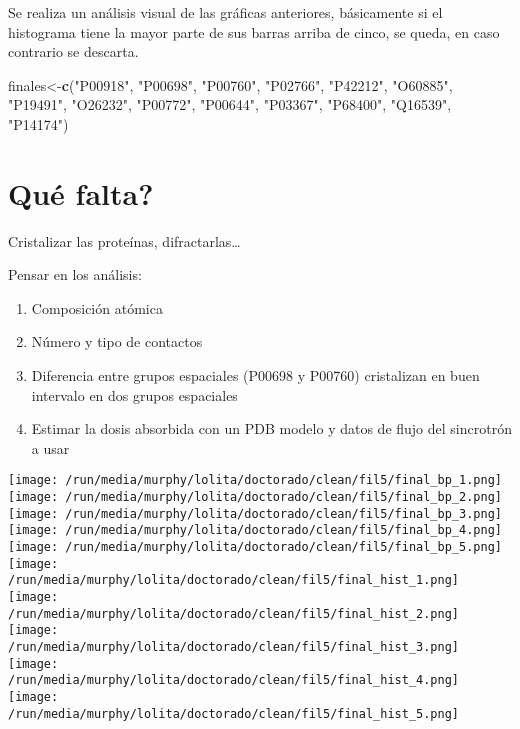\documentclass[
]{book}
\newenvironment{Shaded}{\begin{snugshade}}{\end{snugshade}}
\newcommand{\KeywordTok}[1]{\textcolor[rgb]{0.13,0.29,0.53}{\textbf{#1}}}
\newcommand{\NormalTok}[1]{#1}
\newcommand{\StringTok}[1]{\textcolor[rgb]{0.31,0.60,0.02}{#1}}
\providecommand{\tightlist}{%
  \setlength{\itemsep}{0pt}\setlength{\parskip}{0pt}}
\begin{document}
Se realiza un análisis visual de las gráficas anteriores, básicamente si el histograma tiene la mayor parte de sus barras arriba de cinco, se queda, en caso contrario se descarta.

\begin{Shaded}
\begin{Highlighting}[]
\NormalTok{finales\textless{}{-}}\KeywordTok{c}\NormalTok{(}\StringTok{"P00918"}\NormalTok{, }\StringTok{"P00698"}\NormalTok{, }\StringTok{"P00760"}\NormalTok{, }\StringTok{"P02766"}\NormalTok{, }\StringTok{"P42212"}\NormalTok{, }\StringTok{"O60885"}\NormalTok{, }\StringTok{"P19491"}\NormalTok{, }\StringTok{"O26232"}\NormalTok{, }\StringTok{"P00772"}\NormalTok{, }\StringTok{"P00644"}\NormalTok{, }\StringTok{"P03367"}\NormalTok{, }\StringTok{"P68400"}\NormalTok{, }\StringTok{"Q16539"}\NormalTok{, }\StringTok{"P14174"}\NormalTok{)}
\end{Highlighting}
\end{Shaded}

\hypertarget{quuxe9-falta}{%
\chapter{Qué falta?}\label{quuxe9-falta}}

Cristalizar las proteínas, difractarlas\ldots{}

Pensar en los análisis:

\begin{enumerate}
\def\labelenumi{\arabic{enumi}.}
\tightlist
\item
  Composición atómica
\item
  Número y tipo de contactos
\item
  Diferencia entre grupos espaciales (P00698 y P00760) cristalizan en buen intervalo en dos grupos espaciales
\item
  Estimar la dosis absorbida con un PDB modelo y datos de flujo del sincrotrón a usar
\end{enumerate}

\texttt{[image: /run/media/murphy/lolita/doctorado/clean/fil5/final\_bp\_1.png]}
\texttt{[image: /run/media/murphy/lolita/doctorado/clean/fil5/final\_bp\_2.png]}
\texttt{[image: /run/media/murphy/lolita/doctorado/clean/fil5/final\_bp\_3.png]}
\texttt{[image: /run/media/murphy/lolita/doctorado/clean/fil5/final\_bp\_4.png]}
\texttt{[image: /run/media/murphy/lolita/doctorado/clean/fil5/final\_bp\_5.png]}
\texttt{[image: /run/media/murphy/lolita/doctorado/clean/fil5/final\_hist\_1.png]}
\texttt{[image: /run/media/murphy/lolita/doctorado/clean/fil5/final\_hist\_2.png]}
\texttt{[image: /run/media/murphy/lolita/doctorado/clean/fil5/final\_hist\_3.png]}
\texttt{[image: /run/media/murphy/lolita/doctorado/clean/fil5/final\_hist\_4.png]}
\texttt{[image: /run/media/murphy/lolita/doctorado/clean/fil5/final\_hist\_5.png]}

  
\end{document}

